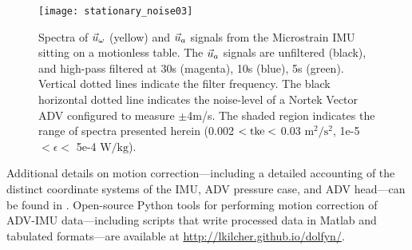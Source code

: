


\begin{figure}
  \centering
  \label{fig:stationary_noise}
  \texttt{[image: stationary\_noise03]}
  \caption{Spectra of $\urot$ (yellow) and $\uacc$ signals from the Microstrain IMU sitting on a motionless table. The $\uacc$ signals are unfiltered (black), and high-pass filtered at 30s (magenta), 10s (blue), 5s (green). Vertical dotted lines indicate the filter frequency. The black horizontal dotted line indicates the noise-level of a Nortek Vector ADV configured to measure $\pm$4m/s. The shaded region indicates the range of spectra presented herein (0.002 $< \mathrm{tke} <$ 0.03 $\mathrm{m^2/s^2}$, 1e-5 $< \epsilon <$ 5e-4 $\mathrm{W/kg}$).}
\end{figure}

Additional details on motion correction---including a detailed accounting of the distinct coordinate systems of the IMU, ADV pressure case, and ADV head---can be found in \cite{Kilcher++2016}. Open-source Python tools for performing motion correction of ADV-IMU data---including scripts that write processed data in Matlab and tabulated formats---are available at \url{http://lkilcher.github.io/dolfyn/}.

\def\ue{\ensuremath{\vec{u}\earth}}


